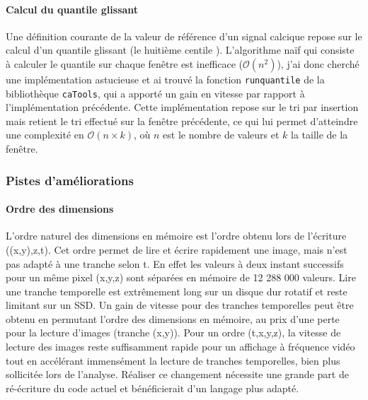 \paragraph{Calcul du quantile glissant}
Une définition courante de la valeur de référence d'un signal calcique repose sur le calcul d'un quantile glissant (le huitième centile  \cite{dombeck_imaging_2007}). L'algorithme naïf qui consiste à calculer le quantile sur chaque fenêtre est inefficace ($\mathcal{O}(n^2)$), j'ai donc cherché une implémentation astucieuse et ai trouvé la fonction \verb|runquantile| de la bibliothèque \verb|caTools|, qui a apporté un gain en vitesse par rapport à l'implémentation précédente. Cette implémentation repose sur le tri par insertion mais retient le tri effectué sur la fenêtre précédente, ce qui lui permet d'atteindre une complexité en $\mathcal{O}(n\times k)$, où $n$ est le nombre de valeurs et $k$ la taille de la fenêtre.



\subsubsection{Pistes d'améliorations}

\paragraph{Ordre des dimensions}
L'ordre naturel des dimensions en mémoire est l'ordre obtenu lors de l'écriture ((x,y),z,t). Cet ordre permet de lire et écrire rapidement une image, mais n'est pas adapté à une tranche selon t. En effet les valeurs à deux instant successifs pour un même pixel (x,y,z) sont séparées en mémoire de 12 288 000 valeurs. Lire une tranche temporelle est extrêmement long sur un disque dur rotatif et reste limitant sur un SSD. Un gain de vitesse pour des tranches temporelles peut être obtenu en permutant l'ordre des dimensions en mémoire, au prix d'une perte pour la lecture d'images (tranche (x,y)). Pour un ordre (t,x,y,z), la vitesse de lecture des images reste suffisamment rapide pour un affichage à fréquence vidéo tout en accélérant immensément la lecture de tranches temporelles, bien plus sollicitée lors de l'analyse. Réaliser ce changement nécessite une grande part de ré-écriture du code actuel et bénéficierait d'un langage plus adapté.

